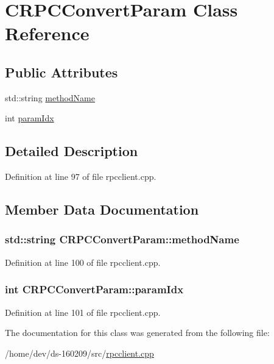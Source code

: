 \hypertarget{class_c_r_p_c_convert_param}{}\section{C\+R\+P\+C\+Convert\+Param Class Reference}
\label{class_c_r_p_c_convert_param}
\subsection*{Public Attributes}
\begin{DoxyCompactItemize}
\item 
std\+::string \hyperlink{class_c_r_p_c_convert_param_a072d6cde94ea57223445dee927ee1527}{method\+Name}
\item 
int \hyperlink{class_c_r_p_c_convert_param_a3bd464f8d5db060616e7be8fbacb58f8}{param\+Idx}
\end{DoxyCompactItemize}


\subsection{Detailed Description}


Definition at line 97 of file rpcclient.\+cpp.



\subsection{Member Data Documentation}
\hypertarget{class_c_r_p_c_convert_param_a072d6cde94ea57223445dee927ee1527}{}
\subsubsection[{method\+Name}]{\setlength{\rightskip}{0pt plus 5cm}std\+::string C\+R\+P\+C\+Convert\+Param\+::method\+Name}\label{class_c_r_p_c_convert_param_a072d6cde94ea57223445dee927ee1527}


Definition at line 100 of file rpcclient.\+cpp.

\hypertarget{class_c_r_p_c_convert_param_a3bd464f8d5db060616e7be8fbacb58f8}{}
\subsubsection[{param\+Idx}]{\setlength{\rightskip}{0pt plus 5cm}int C\+R\+P\+C\+Convert\+Param\+::param\+Idx}\label{class_c_r_p_c_convert_param_a3bd464f8d5db060616e7be8fbacb58f8}


Definition at line 101 of file rpcclient.\+cpp.



The documentation for this class was generated from the following file\+:\begin{DoxyCompactItemize}
\item 
/home/dev/ds-\/160209/src/\hyperlink{rpcclient_8cpp}{rpcclient.\+cpp}\end{DoxyCompactItemize}
